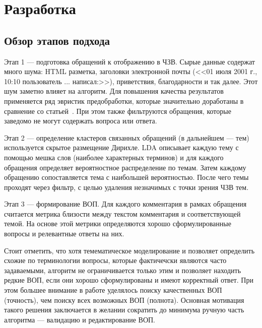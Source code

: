 \chapter{Разработка}
\label{chap:dev}

\section{Обзор этапов подхода}
\label{sec:overview}

Этап 1 --- подготовка обращений к отображению в ЧЗВ. Сырые данные содержат много шума: HTML разметка, заголовки электронной почты (<<01 июля 2001 г., 10:10 пользователь ... написал:>>), приветствия, благодарности и так далее. Этот шум заметно влияет на алгоритм. Для повышения качества результатов применяется ряд эвристик предобработки, которые значительно доработаны в сравнение со статьей~\cite{original}. При этом также фильтруются обращения, которые заведомо не могут содержать вопроса или ответа. 

Этап 2 --- определение кластеров связанных обращений (в дальнейшем --- тем) используется скрытое размещение Дирихле. LDA описывает каждую тему с помощью мешка слов (наиболее характерных терминов) и для каждого обращения определяет вероятностное распределение по темам. Затем каждому обращению сопоставляется тема с наибольшей вероятностью. После чего темы проходят через фильтр, с целью удаления незначимых с точки зрения ЧЗВ тем.

Этап 3 --- формирование ВОП. Для каждого комментария в рамках обращения считается метрика близости между текстом комментария и соответствующей темой. На основе этой метрики определяются хорошо сформулированные вопросы и релевантные ответы на них.

Стоит отметить, что хотя темематическое моделирование и позволяет определить схожие по терминологии вопросы, которые фактичечски являются часто задаваемыми, алгоритм не ограничивается только этим и позволяет находить редкие ВОП, если они хорошо сформулированы и имеют корректный ответ. При этом большее внимание в работе уделялось поиску качественных ВОП (точность), чем поиску всех возможных ВОП (полнота). Основная мотивация такого решения заключается в желании сократить до минимума ручную часть алгоритма --- валидацию и редактирование ВОП.

